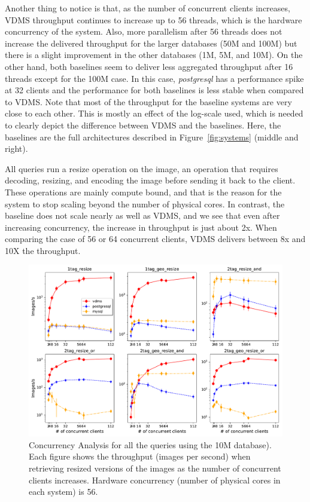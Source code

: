 Another thing to notice is that, as the number of concurrent clients increases,
VDMS throughput continues to increase up to 56 threads, which is
the hardware concurrency of the system.
Also, more parallelism after 56 threads does not increase the delivered throughput
for the larger databases (50M and 100M) but there is a slight improvement in the
other databases (1M, 5M, and 10M).
On the other hand, both baselines seem to deliver less aggregated
throughput after 16 threads except for the 100M case.
In this case, \textit{postgresql} has a performance spike at 32 clients
and the performance for both baselines is less stable when compared
to VDMS.
Note that most of the throughput for the baseline systems are very close to each other.
This is mostly an effect of the log-scale used, which is needed to clearly
depict the difference between VDMS and the baselines.
Here, the baselines are the full architectures described in
Figure~\ref{fig:systems} (middle and right).

All queries run a resize operation on the image,
an operation that requires decoding, resizing, and encoding the image
before sending it back to the client.
These operations are mainly compute bound, and that is the reason for
the system to stop scaling beyond the number of physical cores.
In contrast, the baseline does not scale nearly as well as VDMS,
and we see that even after increasing concurrency, the increase
in throughput is just about 2x.
When comparing the case of 56 or 64 concurrent clients,
VDMS delivers between 8x and 10X the throughput.

\begin{figure}[ht]
\includegraphics[width=\columnwidth]{figures/plot_conc_dbsize_10M_mosaic_results_throughput}
\caption{Concurrency Analysis for all the queries using the 10M database).
Each figure shows the throughput (images per second) when retrieving
resized versions of the images as the number of concurrent clients increases.
Hardware concurrency (number of physical cores in each system)
is 56.}
\label{fig:concurrency_comparison_10M}
\end{figure}

